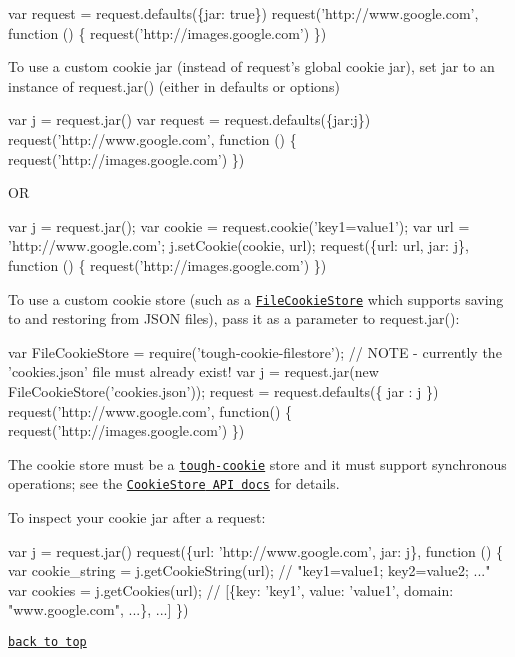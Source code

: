 \begin{DoxyCode}
var request = request.defaults(\{jar: true\})
request('http://www.google.com', function () \{
  request('http://images.google.com')
\})
\end{DoxyCode}


To use a custom cookie jar (instead of {\ttfamily request}’s global cookie jar), set {\ttfamily jar} to an instance of {\ttfamily request.\+jar()} (either in {\ttfamily defaults} or {\ttfamily options})


\begin{DoxyCode}
var j = request.jar()
var request = request.defaults(\{jar:j\})
request('http://www.google.com', function () \{
  request('http://images.google.com')
\})
\end{DoxyCode}


OR


\begin{DoxyCode}
var j = request.jar();
var cookie = request.cookie('key1=value1');
var url = 'http://www.google.com';
j.setCookie(cookie, url);
request(\{url: url, jar: j\}, function () \{
  request('http://images.google.com')
\})
\end{DoxyCode}


To use a custom cookie store (such as a \href{https://github.com/mitsuru/tough-cookie-filestore}{\tt {\ttfamily File\+Cookie\+Store}} which supports saving to and restoring from J\+S\+ON files), pass it as a parameter to {\ttfamily request.\+jar()}\+:


\begin{DoxyCode}
var FileCookieStore = require('tough-cookie-filestore');
// NOTE - currently the 'cookies.json' file must already exist!
var j = request.jar(new FileCookieStore('cookies.json'));
request = request.defaults(\{ jar : j \})
request('http://www.google.com', function() \{
  request('http://images.google.com')
\})
\end{DoxyCode}


The cookie store must be a \href{https://github.com/SalesforceEng/tough-cookie}{\tt {\ttfamily tough-\/cookie}} store and it must support synchronous operations; see the \href{https://github.com/SalesforceEng/tough-cookie#cookiestore-api}{\tt {\ttfamily Cookie\+Store} A\+PI docs} for details.

To inspect your cookie jar after a request\+:


\begin{DoxyCode}
var j = request.jar()
request(\{url: 'http://www.google.com', jar: j\}, function () \{
  var cookie\_string = j.getCookieString(url); // "key1=value1; key2=value2; ..."
  var cookies = j.getCookies(url);
  // [\{key: 'key1', value: 'value1', domain: "www.google.com", ...\}, ...]
\})
\end{DoxyCode}


\href{#table-of-contents}{\tt back to top} 